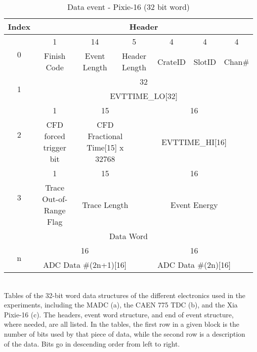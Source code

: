 \begin{landscape}
    \begin{table}[]
    \ContinuedFloat
    \begin{subtable}[]{1.3\textwidth}
    \small
    \centering
    \caption{\label{tab:word_XIA}Data event - Pixie-16 (32 bit word)}
    \begin{tabular}{c|c|c|c|c|c|c|c|c|c|c|c|c|c|c|c|c|c|c|c|c|c|c|c|c|c|c|c|c|c|c|c|c}
    \toprule
        Index & \multicolumn{32}{|c}{Header}\\
        \midrule
        \multirow{2}{*}{0} & 1 & \multicolumn{14}{|c|}{14} & \multicolumn{5}{|c|}{5} & \multicolumn{4}{|c|}{4} & \multicolumn{4}{|c|}{4} & \multicolumn{4}{|c}{4} \\
        \cline{2-33}
        & Finish Code & \multicolumn{14}{|c|}{Event Length} & \multicolumn{5}{|c|}{Header Length} & \multicolumn{4}{|c|}{CrateID} & \multicolumn{4}{|c|}{SlotID} & \multicolumn{4}{|c}{Chan\#} \\
        \midrule
        \multirow{2}{*}{1} & \multicolumn{32}{|c}{32} \\
        \cline{2-33}
        & \multicolumn{32}{|c}{EVTTIME\_LO[32]} \\
        \midrule
        \multirow{2}{*}{2} & 1 & \multicolumn{15}{|c|}{15} & \multicolumn{16}{|c}{16}\\
        \cline{2-33}
        & CFD forced trigger bit & \multicolumn{15}{|c|}{CFD Fractional Time[15] x 32768} & \multicolumn{16}{|c}{EVTTIME\_HI[16]} \\
        \midrule
        \multirow{2}{*}{3} & 1 & \multicolumn{15}{|c|}{15} & \multicolumn{16}{|c}{16}\\
        \cline{2-33}
        & Trace Out-of-Range Flag & \multicolumn{15}{|c|}{Trace Length} & \multicolumn{16}{|c}{Event Energy}\\
        \midrule
        \multicolumn{33}{c}{Data Word} \\
        \midrule
        \multirow{2}{*}{n} & \multicolumn{16}{|c|}{16} & \multicolumn{16}{|c}{16} \\
        \cline{2-33}
        & \multicolumn{16}{|c|}{ADC Data #(2n+1)[16]} & \multicolumn{16}{|c}{ADC Data #(2n)[16]} \\
        \bottomrule
    \end{tabular}
    \end{subtable}
    \\[2]
    \footnotesize
    Tables of the 32-bit word data structures of the different electronics used in the experiments, including the MADC (a), the CAEN 775 TDC (b), and the Xia Pixie-16 (c). The headers, event word structure, and end of event structure, where needed, are all listed. In the tables, the first row in a given block is the number of bits used by that piece of data, while the second row is a description of the data. Bits go in descending order from left to right.
\end{table}
\end{landscape}